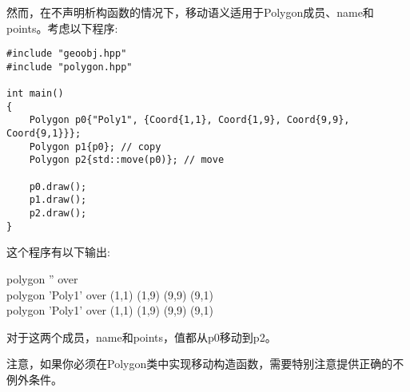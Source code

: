 然而，在不声明析构函数的情况下，移动语义适用于Polygon成员、name和points。考虑以下程序:\par

{\color{red}{poly/polygon.cpp}}

\begin{lstlisting}[caption={}]
#include "geoobj.hpp"
#include "polygon.hpp"

int main()
{
	Polygon p0{"Poly1", {Coord{1,1}, Coord{1,9}, Coord{9,9}, Coord{9,1}}};
	Polygon p1{p0}; // copy
	Polygon p2{std::move(p0)}; // move
	
	p0.draw();
	p1.draw();
	p2.draw();
}
\end{lstlisting}

这个程序有以下输出:\par

\begin{tcolorbox}[colback=white,colframe=black]
polygon '' over \\
polygon 'Poly1' over (1,1) (1,9) (9,9) (9,1) \\
polygon 'Poly1' over (1,1) (1,9) (9,9) (9,1) 
\end{tcolorbox}

对于这两个成员，name和points，值都从p0移动到p2。\par

注意，如果你必须在Polygon类中实现移动构造函数，需要特别注意提供正确的不例外条件。\par



























































